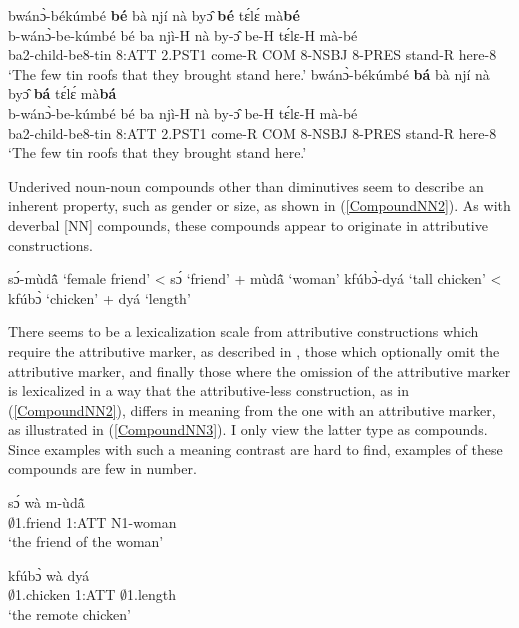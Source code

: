\begin{exe} 
\ex\label{CompoundNNAGR}
\begin{xlist}
\ex\label{CompoundNNAGR1}
 \glll  bwánɔ̀-békúmbé {\bfseries bé} bà njí nà byɔ̂ {\bfseries bé} tɛ́lɛ́ mà{\bfseries bé}  \\
         b-wánɔ̀-be-kúmbé bé ba njì-H nà by-ɔ̂ be-H tɛ́lɛ-H mà-bé \\
          ba2-child-be8-tin 8:ATT 2.PST1 come-R COM 8-NSBJ 8-PRES stand-R here-8   \\
    \trans `The few tin roofs that they brought stand here.'
\ex\label{CompoundNNAGR2}
 \glll  *bwánɔ̀-békúmbé {\bfseries bá} bà njí nà byɔ̂ {\bfseries bá} tɛ́lɛ́ mà{\bfseries bá}  \\
         b-wánɔ̀-be-kúmbé bé ba njì-H nà by-ɔ̂ be-H tɛ́lɛ-H mà-bé \\
          ba2-child-be8-tin 8:ATT 2.PST1 come-R COM 8-NSBJ 8-PRES stand-R here-8   \\
    \trans `The few tin roofs that they brought stand here.'
\end{xlist}
\end{exe}


Underived noun-noun compounds other than diminutives seem to describe an inherent property, such as gender or size, as shown in (\ref{CompoundNN2}). As with deverbal [NN] compounds, these compounds appear to originate in attributive constructions.   

\begin{exe}
\ex\label{CompoundNN2} 
\begin{xlist}
\ex sɔ́-mùdã̂ `female friend' < sɔ́ `friend' + mùdã̂ `woman'
\ex kfúbɔ̀-dyá `tall chicken' < kfúbɔ̀ `chicken' + dyá `length'
\end{xlist}
\end{exe}

\noindent There seems to be a lexicalization scale from attributive constructions which require the attributive marker, as described in , those which optionally omit the attributive marker, and finally those where the omission of the attributive marker is lexicalized in a way that the attributive-less construction, as in (\ref{CompoundNN2}), differs in meaning from the one with an attributive marker, as illustrated in (\ref{CompoundNN3}). I only view the latter type as compounds. Since examples with such a meaning contrast are hard to find, examples of these compounds are few in number.

\begin {exe} \ex\label {CompoundNN3}
\begin{xlist}
\parbox[t]{2.5in}{ \ex \gll
sɔ́ wà m-ùdã̂  \\ 
$\emptyset$1.friend 1:ATT N1-woman \\
`the friend of the woman' }
\parbox[t]{2.5in}{ \ex \gll
kfúbɔ̀ wà dyá \\
   $\emptyset$1.chicken 1:ATT $\emptyset$1.length \\
 `the remote chicken'}
\end{xlist}
\end {exe}

